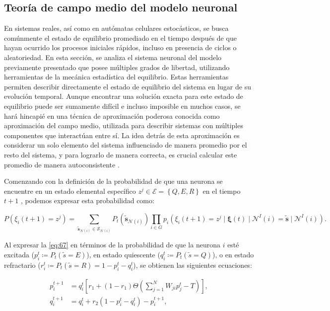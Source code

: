 \subsection{Teoría de campo medio del modelo neuronal}

En sistemas reales, así como en autómatas celulares estocásticos, se busca comúnmente el estado de equilibrio promediado en el tiempo después de que hayan ocurrido los procesos iniciales rápidos, incluso en presencia de ciclos o aleatoriedad. En esta sección, se analiza el sistema neuronal del modelo previamente presentado que posee múltiples grados de libertad, utilizando herramientas de la mecánica estadística del equilibrio. Estas herramientas permiten describir directamente el estado de equilibrio del sistema en lugar de su evolución temporal. Aunque encontrar una solución exacta para este estado de equilibrio puede ser sumamente difícil e incluso imposible en muchos casos, se hará hincapié en una técnica de aproximación poderosa conocida como aproximación del campo medio, utilizada para describir sistemas con múltiples componentes que interactúan entre sí. La idea detrás de esta aproximación es considerar un solo elemento del sistema influenciado de manera promedio por el resto del sistema, y para lograrlo de manera correcta, es crucial calcular este promedio de manera autoconsistente \cite{bar-yam_dynamics_2003}.

Comenzando con la definición de la probabilidad de que una neurona se encuentre en un estado elemental específico $z^j \in \mathcal{E}=\left\{Q,E,R\right\}$  en el tiempo $t+1$   , podemos expresar esta probabilidad como:

\begin{equation}\label{eq:67}
	P\left(\xi_i(t+1)=z^j\right)=\sum_{\tilde{\mathbf{s}}_{\mathcal{N}(i)}\in\mathcal{S}_{\mathcal{N}(i)}}{P_t(\tilde{\mathbf{s}}_{\mathcal{N}(i)})}\prod_{i\in G}  {p_i\left(\xi_i(t+1)=z^j \mid  \bm{\xi}(t)\mid  \mathcal{N}^I(i) = \tilde{\mathbf{s}}\mid \mathcal{N}^I(i)   \right)}.	
\end{equation}

Al expresar la  \cref{eq:67}  en términos de la probabilidad de que la neurona $i$ esté excitada ($p_i^t \coloneqq  P_t(\tilde{s}=E)$),  en estado quiescente ($q_i^t \coloneqq  P_t(\tilde{s}=Q)$),  o en estado refractario ($r_i^t \coloneqq  P_t(\tilde{s}=R) =1-p_i^t-q_i^t$), se obtienen las siguientes ecuaciones:


\begin{align}
p_i^{t+1}&=q_i^t\left[r_1+\left(1-r_1\right)\Theta\left(\sum_{j=1}^{N}W_{ji}p_j^t-T\right)\right], \label{eq:56}\\
q_i^{t+1}&=q_i^t+r_2\left(1-p_i^t-q_i^t\right)-p_i^{t+1} \label{eq:57},
\end{align}


